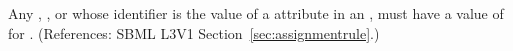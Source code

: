 Any \Compartment, \Species, \Parameter or \SpeciesReference whose identifier is the value of a
 attribute in an \AssignmentRule, must have a value of
 for .  (References: SBML
L3V1 Section~\ref{sec:assignmentrule}.)
